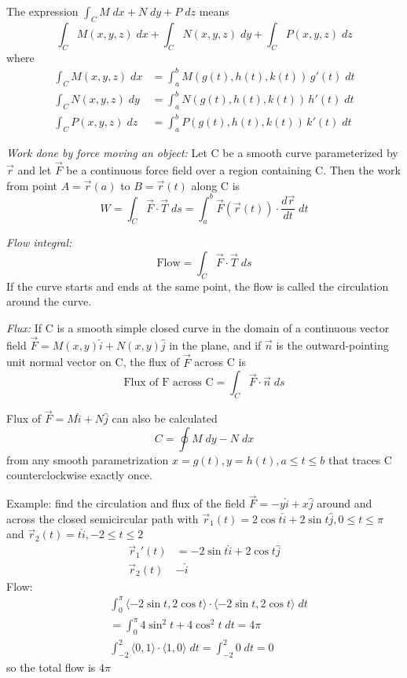 \documentclass[12pt]{article}
\begin{document}
The expression $\int_C M \; dx + N \; dy + P \; dz$ means 
\[\int_C M(x,y,z) \; dx + \int_C N(x,y,z) \; dy + \int_C P(x,y,z) \; dz\]
where 
\begin{align*}
    \int_C M(x,y,z) \; dx &= \int_a^b M(g(t), h(t), k(t)) \, g'(t) \; dt\\
    \int_C N(x,y,z) \; dy &= \int_a^b N(g(t), h(t), k(t)) \, h'(t) \; dt\\
    \int_C P(x,y,z) \; dz &= \int_a^b P(g(t), h(t), k(t)) \, k'(t) \; dt
\end{align*}

\emph{Work done by force moving an object:}
Let C be a smooth curve parameterized by $\vec{r}$ and let $\vec{F}$ be a continuous force field over a region containing C. Then the work from point $A=\vec{r}(a)$ to $B=\vec{r}(t)$ along C is 
\[W= \int_C \vec{F} \cdot \vec{T} \; ds = \int_a^b \vec{F}(\vec{r}(t)) \cdot \frac{d\vec{r}}{dt} \; dt\]

\emph{Flow integral:}
\[\text{Flow} = \int_C \vec{F} \cdot \vec{T} \; ds\]
If the curve starts and ends at the same point, the flow is called the circulation around the curve. 

\emph{Flux:}
If C is a smooth simple closed curve in the domain of a continuous vector field $\vec{F} = M(x,y) \hat{i} + N(x,y) \hat{j}$ in the plane, and if $\vec{n}$ is the outward-pointing unit normal vector on  C, the flux of $\vec{F}$ across C is 
\[\text{Flux of F across C} = \int_C \vec{F} \cdot \vec{n} \; ds\]

Flux of $\vec{F} = M\hat{i} + N\hat{j}$ can also be calculated 
\[C = \oint M \; dy - N \; dx\]
from any smooth parametrization $x=g(t), y=h(t), a\leq t\leq b$ that traces C counterclockwise exactly once. 

Example: find the circulation and flux of the field $\vec{F} = -y\hat{i} + x \hat{j}$ around and across the closed semicircular path with $\vec{r}_1(t) = 2\cos t \hat{i} + 2\sin t \hat{j}, 0\leq t \leq \pi$ and $\vec{r}_2(t) = t\hat{i}, -2\leq t \leq 2$
\begin{align*}
    \vec{r}_1' (t) &= -2 \sin t \hat{i} + 2\cos{t} \hat{j}\\
    \vec{r}_2 (t) &- \hat{i} 
\end{align*}
Flow: 
\begin{align*}
    &\int_0^\pi \langle -2\sin t, 2\cos t\rangle \cdot \langle -2 \sin t, 2\cos t\rangle \; dt\\
    &= \int_0^\pi 4\sin^2 t + 4 \cos^2 t \; dt = 4\pi\\
    &\int_{-2}^2 \langle 0, 1 \rangle \cdot \langle 1, 0 \rangle \; dt = \int_{-2}^2 0 \; dt = 0
\end{align*}
so the total flow is $4\pi$
\end{document}
